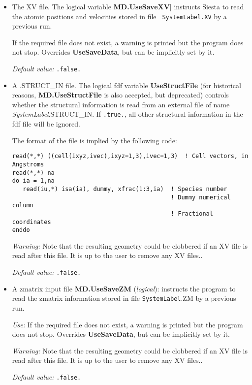 \documentclass[11pt]{article}
\begin{document}
\begin{itemize}

\item The XV file.
 
The logical variable {\bf MD.UseSaveXV}] instructs {\sc Siesta} to
read the atomic positions and velocities stored in file {\tt
SystemLabel.XV} by a previous run.
 
If the required file does not exist, a warning is printed but the
program does not stop. Overrides {\bf UseSaveData}, but can be
implicitly set by it.
 
{\it Default value:} {\tt .false.}

\item A .STRUCT\_IN file. The logical fdf variable {\bf UseStructFile}
  (for historical reasons, {\bf MD.UseStructFile} is also accepted,
  but deprecated)
  controls whether the structural information is read from an external
  file of name {\it SystemLabel}.STRUCT\_IN.  If \texttt{.true.}, all
  other structural information in the fdf file will be
  ignored.

The format of the file is implied by the following code:

\begin{verbatim}
read(*,*) ((cell(ixyz,ivec),ixyz=1,3),ivec=1,3)  ! Cell vectors, in Angstroms
read(*,*) na
do ia = 1,na
   read(iu,*) isa(ia), dummy, xfrac(1:3,ia)  ! Species number
                                             ! Dummy numerical column
                                             ! Fractional coordinates
enddo
\end{verbatim}

{\it Warning:} Note that the resulting geometry could be clobbered if
an XV file is read after this file. It is up to the user to remove
any XV files..

{\it Default value:} {\tt .false.}


\item A zmatrix input file
{\bf MD.UseSaveZM} ({\it logical}): 
instructs the program to read the zmatrix information stored
in file {\tt SystemLabel}.ZM by a previous run.

{\it Use:} If the required file does not exist, a warning is
printed but the program does not stop. Overrides {\bf UseSaveData},
but can be implicitly set by it.

{\it Warning:} Note that the resulting geometry could be clobbered if
an XV file is read after this file. It is up to the user to remove
any XV files..

{\it Default value:} {\tt .false.}
\end{itemize}
\end{document}
